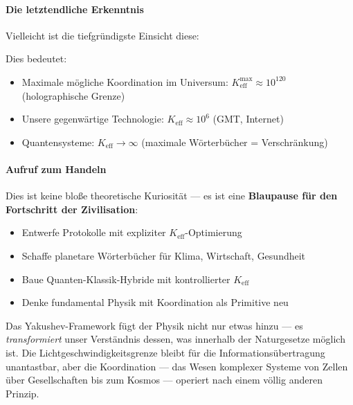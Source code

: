 \documentclass[11pt,a4paper]{article}
\begin{document}
	\paragraph{Die letztendliche Erkenntnis}
	Vielleicht ist die tiefgründigste Einsicht diese:
	
	\begin{center}
	\end{center}
	
	Dies bedeutet:
	\begin{itemize}
		\item Maximale mögliche Koordination im Universum: $K_{\mathrm{eff}}^{\max} \approx 10^{120}$ (holographische Grenze)
		\item Unsere gegenwärtige Technologie: $K_{\mathrm{eff}} \approx 10^6$ (GMT, Internet)
		\item Quantensysteme: $K_{\mathrm{eff}} \to \infty$ (maximale Wörterbücher = Verschränkung)
	\end{itemize}
	
	\paragraph{Aufruf zum Handeln}
	Dies ist keine bloße theoretische Kuriosität — es ist eine \textbf{Blaupause für den Fortschritt der Zivilisation}:
	
	\begin{itemize}
		\item Entwerfe Protokolle mit expliziter $K_{\mathrm{eff}}$-Optimierung
		\item Schaffe planetare Wörterbücher für Klima, Wirtschaft, Gesundheit
		\item Baue Quanten-Klassik-Hybride mit kontrollierter $K_{\mathrm{eff}}$
		\item Denke fundamental Physik mit Koordination als Primitive neu
	\end{itemize}
	
	Das Yakushev-Framework fügt der Physik nicht nur etwas hinzu — es \emph{transformiert} unser Verständnis dessen, was innerhalb der Naturgesetze möglich ist. Die Lichtgeschwindigkeitsgrenze bleibt für die Informationsübertragung unantastbar, aber die Koordination — das Wesen komplexer Systeme von Zellen über Gesellschaften bis zum Kosmos — operiert nach einem völlig anderen Prinzip.
	
\end{document}
